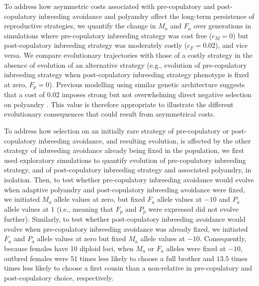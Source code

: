 \documentclass[12pt]{article}
\begin{document}
To address how asymmetric costs associated with pre-copulatory and post-copulatory inbreeding avoidance and polyandry affect the long-term persistence of reproductive strategies, we quantify the change in $M_{a}$ and $F_{a}$ over generations in simulations where pre-copulatory inbreeding strategy was cost free ($c_{M}=0$) but post-copulatory inbreeding strategy was moderately costly ($c_{F}=0.02$), and vice versa. We compare evolutionary trajectories with those of a costly strategy in the absence of evolution of an alternative strategy (e.g., evolution of pre-copulatory inbreeding strategy when post-copulatory inbreeding strategy phenotype is fixed at zero, $F_{p}=0$). Previous modelling using similar genetic architecture suggests that a cost of $0.02$ imposes strong but not overwhelming direct negative selection on polyandry \cite[][]{Duthie}. This value is therefore appropriate to illustrate the different evolutionary consequences that could result from asymmetrical costs.

To address how selection on an initially rare strategy of pre-copulatory or post-copulatory inbreeding avoidance, and resulting evolution, is affected by the other strategy of inbreeding avoidance already being fixed in the population, we first used exploratory simulations to quantify evolution of pre-copulatory inbreeding strategy, and of post-copulatory inbreeding strategy and associated polyandry, in isolation. Then, to test whether pre-copulatory inbreeding avoidance would evolve when adaptive polyandry and post-copulatory inbreeding avoidance were fixed, we initiated $M_{a}$ allele values at zero, but fixed $F_{a}$ allele values at $-10$ and $P_{a}$ allele values at $1$ (i.e., meaning that $F_{p}$ and $P_{p}$ were expressed did not evolve further). Similarly, to test whether post-copulatory inbreeding avoidance would evolve when pre-copulatory inbreeding avoidance was already fixed, we initiated $F_{a}$ and $P_{a}$ allele values at zero but fixed $M_{a}$ allele values at $-10$. Consequently, because females have 10 diploid loci, when $M_{a}$ or $F_{a}$ alleles were fixed at $-10$, outbred females were $51$ times less likely to choose a full brother and $13.5$ times times less likely to choose a first cousin than a non-relative in pre-copulatory and post-copulatory choice, respectively.
\end{document}

